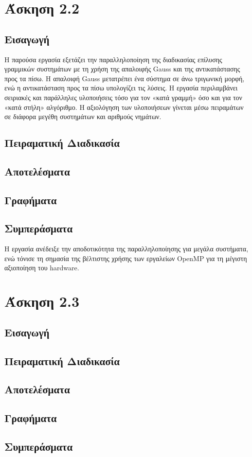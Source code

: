 \documentclass{article}
\begin{document}
\section*{Άσκηση 2.2}
\subsection*{Εισαγωγή}
Η παρούσα εργασία εξετάζει την παραλληλοποίηση της διαδικασίας επίλυσης γραμμικών συστημάτων με τη χρήση της απαλοιφής Gauss και της αντικατάστασης προς τα πίσω. Η απαλοιφή Gauss μετατρέπει ένα σύστημα σε άνω τριγωνική μορφή, ενώ η αντικατάσταση προς τα πίσω υπολογίζει τις λύσεις. Η εργασία περιλαμβάνει σειριακές και παράλληλες υλοποιήσεις τόσο για τον «κατά γραμμή» όσο και για τον «κατά στήλη» αλγόριθμο. Η αξιολόγηση των υλοποιήσεων γίνεται μέσω πειραμάτων σε διάφορα μεγέθη συστημάτων και αριθμούς νημάτων.
\subsection*{Πειραματική Διαδικασία}
\subsection*{Αποτελέσματα}
\subsection*{Γραφήματα}
\subsection*{Συμπεράσματα}
Η εργασία ανέδειξε την αποδοτικότητα της παραλληλοποίησης για μεγάλα συστήματα, ενώ τόνισε τη σημασία της βέλτιστης χρήσης των εργαλείων OpenMP για τη μέγιστη αξιοποίηση του hardware.
\section*{Άσκηση 2.3}
\subsection*{Εισαγωγή}
\subsection*{Πειραματική Διαδικασία}
\subsection*{Αποτελέσματα}
\subsection*{Γραφήματα}
\subsection*{Συμπεράσματα}
\end{document}

